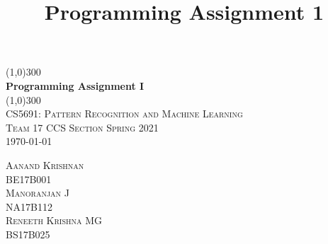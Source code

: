 \documentclass{article}
\title{Programming Assignment 1}
\begin{document}
\begin{titlepage}
	\begin{center}
    \line(1,0){300}\\
    [0.65cm]
	\huge{\bfseries Programming Assignment I}\\
	\line(1,0){300}\\
	\textsc{\Large CS5691: Pattern Recognition and Machine Learning}\\
	\textsc{\large{Team 17 CCS Section Spring 2021}}\\
	\textsc{ \small{\today}}\\
	[5.5cm]     
	\end{center}
	\begin{flushright}
		\textsc{\Large Aanand Krishnan\\\small{BE17B001}}\\
		[0.5cm]
		\textsc{\Large Manoranjan J\\ \small{NA17B112}}\\
		[0.5cm]
		\textsc{\Large Reneeth Krishna MG\\\small{BS17B025}}
	\end{flushright}
\end{titlepage}
\tableofcontents
\newpage




\newpage



\newpage





\end{document}
